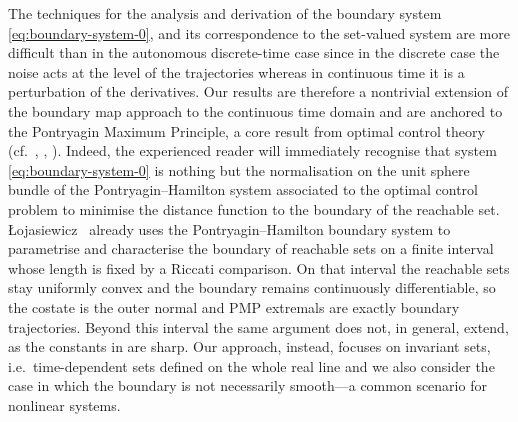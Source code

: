 \documentclass[reqno]{amsart}
\theoremstyle{definition}
\numberwithin{equation}{section}
\begin{document}
The techniques for the analysis and derivation of the boundary system \eqref{eq:boundary-system-0}, and its correspondence to the set-valued system are more difficult than in the autonomous discrete-time case since in the discrete case the noise acts at the level of the trajectories whereas in continuous time it is a perturbation of the derivatives. 
Our results are therefore a nontrivial extension of the boundary map approach to the continuous time domain and are anchored to the Pontryagin Maximum Principle, a core result from optimal control theory (cf.~\cite{bressan2007introduction}, \cite{lee1986foundations}, \cite{pontryagin1962optimal}). Indeed, the experienced reader will immediately recognise that system \eqref{eq:boundary-system-0} is nothing but the normalisation on the unit sphere bundle of the Pontryagin--Hamilton system associated to the optimal control problem to minimise the distance  function to the boundary of the reachable set.  Łojasiewicz~\cite{lojasiewicz1980sufficiency} already uses the Pontryagin–Hamilton boundary system to parametrise and characterise the boundary of reachable sets on a finite interval whose length is fixed by a Riccati comparison. On that interval the reachable sets stay uniformly convex and the boundary remains continuously differentiable, so the costate is the outer normal and PMP extremals are exactly boundary trajectories. Beyond this interval the same argument does not, in general, extend, as the constants in \cite{lojasiewicz1980sufficiency} are sharp.   Our approach, instead, focuses on invariant sets, i.e.~time-dependent sets defined on the whole real line and we also consider the case in which the boundary is not necessarily smooth---a common scenario for nonlinear systems. 
  

\end{document}
